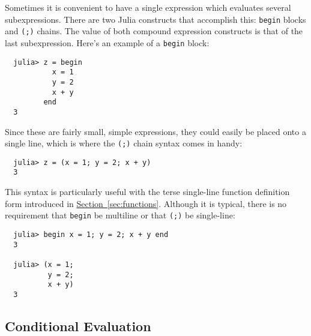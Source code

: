 \documentclass{article}
\renewcommand{\sec}[1]{\label{sec:#1}}
\newcommand{\Section}[1]{\hyperref[sec:#1]{Section~\ref*{sec:#1}}}
\begin{document}
Sometimes it is convenient to have a single expression which evaluates several subexpressions.
There are two Julia constructs that accomplish this:
\verb|begin| blocks and \verb|(;)| chains.
The value of both compound expression constructs is that of the last subexpression.
Here's an example of a \verb|begin| block:
\begin{verbatim}
  julia> z = begin
           x = 1
           y = 2
           x + y
         end
  3
\end{verbatim}
Since these are fairly small, simple expressions, they could easily be placed onto a single line, which is where the \verb|(;)| chain syntax comes in handy:
\begin{verbatim}
  julia> z = (x = 1; y = 2; x + y)
  3
\end{verbatim}
This syntax is particularly useful with the terse single-line function definition form introduced in \Section{functions}.
Although it is typical, there is no requirement that \verb|begin| be multiline or that \verb|(;)| be single-line:
\begin{verbatim}
  julia> begin x = 1; y = 2; x + y end
  3

  julia> (x = 1;
          y = 2;
          x + y)
  3
\end{verbatim}

\subsection{Conditional Evaluation}\sec{conditional-evaluation}
\end{document}
